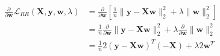 \newcommand{\matrix}[1]{\mathbf{#1}}
\newcommand{\vector}[1]{\mathbf{#1}}
\newcommand{\X}{\matrix{X}}
\newcommand{\y}{\vector{y}}
\newcommand{\w}{\vector{w}}
\begin{align*}
\frac{\partial}{\partial \w} \mathcal{L}_{RR} (\X,\y,\w,\lambda) &= \frac{\partial}{\partial \w} \left[ \frac{1}{n} \|\y - \X\w\|_2^2 + \lambda \|\w\|_2^2 \right] \\
&=  \frac{1}{n} \frac{\partial}{\partial \w} \|\y - \X\w\|_2^2 + \lambda \frac{\partial}{\partial \w} \|\w\|_2^2 \\
&= \frac{1}{n} 2(\y - \X\w)^T (-\X) + \lambda 2 \w^T
\end{align*}
